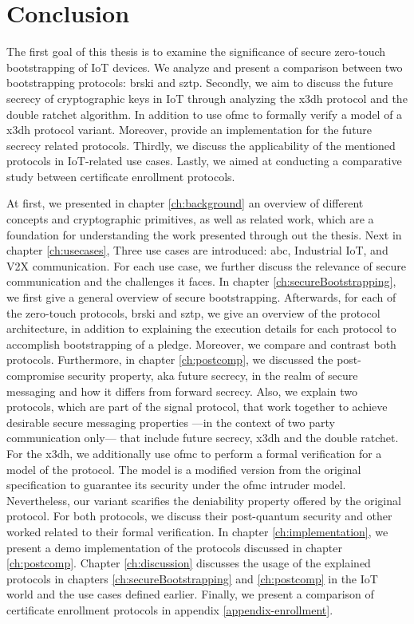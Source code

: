 \chapter{Conclusion}
\label{ch:conclusion}
The first goal of this thesis is to examine the significance of secure zero-touch bootstrapping of IoT devices. We analyze and present a comparison between two bootstrapping protocols: \gls{brski} and \gls{sztp}. 
Secondly, we aim to discuss the future secrecy of cryptographic keys in IoT through analyzing the \gls{x3dh} protocol and the double ratchet algorithm. In addition to use \gls{ofmc} to formally verify a model of a \gls{x3dh} protocol variant. Moreover, provide an implementation for the future secrecy related protocols.
Thirdly, we discuss the applicability of the mentioned protocols in IoT-related use cases.
Lastly, we aimed at conducting a comparative study between certificate enrollment protocols.

At first, we presented in chapter \ref{ch:background} an overview of different concepts and cryptographic primitives, as well as related work, which are a foundation for understanding the work presented through out the thesis. Next in chapter \ref{ch:usecases}, Three use cases are introduced: \acrfull{abc}, Industrial IoT, and V2X communication. For each use case, we further discuss the relevance of secure communication and the challenges it faces. In chapter \ref{ch:secureBootstrapping}, we first give a general overview of secure bootstrapping. Afterwards, for each of the zero-touch protocols, \gls{brski} and \gls{sztp}, we give an overview of the protocol architecture, in addition to explaining the execution details for each protocol to accomplish bootstrapping of a pledge. Moreover, we compare and contrast both protocols. Furthermore, in chapter \ref{ch:postcomp}, we discussed the post-compromise security property, aka future secrecy, in the realm of secure messaging and how it differs from forward secrecy. Also, we explain two protocols, which are part of the signal protocol, that work together to achieve desirable secure messaging properties ---in the context of two party communication only--- that include future secrecy, \gls{x3dh} and the double ratchet. For the \gls{x3dh}, we additionally use \gls{ofmc} to perform a formal verification for a model of the protocol. The model is a modified version from the original specification to guarantee its security under the \gls{ofmc} intruder model. Nevertheless, our variant scarifies the deniability property offered by the original protocol. For both protocols, we discuss their post-quantum security and other worked related to their formal verification. In chapter \ref{ch:implementation}, we present a demo implementation of the protocols discussed in chapter \ref{ch:postcomp}. Chapter \ref{ch:discussion} discusses the usage of the explained protocols in chapters \ref{ch:secureBootstrapping} and \ref{ch:postcomp} in the IoT world and the use cases defined earlier. Finally, we present a comparison of certificate enrollment protocols in appendix \ref{appendix-enrollment}. 


